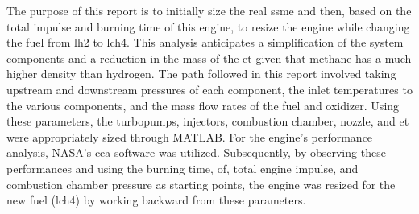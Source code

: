 
The purpose of this report is to initially size the real \acrfull{ssme} and then, based on the total impulse and burning time of this engine, to resize the engine while changing the fuel from \acrlong{lh2} to \acrfull{lch4}. 
This analysis anticipates a simplification of the system components and a reduction in the mass of the \acrfull{et} given that methane has a much higher density than hydrogen. 
The path followed in this report involved taking upstream and downstream pressures of each component, the inlet temperatures to the various components, and the mass flow rates of the fuel and oxidizer.
Using these parameters, the turbopumps, injectors, combustion chamber, nozzle, and \acrlong{et} were appropriately sized through MATLAB. For the engine's performance analysis, NASA's \acrfull{cea} software was utilized.
Subsequently, by observing these performances and using the burning time, \acrfull{of}, total engine impulse, and combustion chamber pressure as starting points, the engine was resized for the new fuel (\acrshort{lch4}) by working backward from these parameters.



